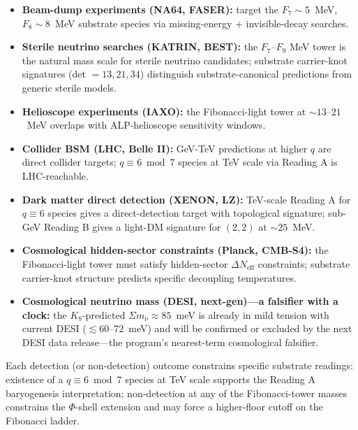\documentclass[11pt]{article}
\begin{document}
\begin{itemize}
\item \textbf{Beam-dump experiments (NA64, FASER):} target the $F_7 \sim 5$~MeV, $F_8 \sim 8$~MeV substrate species via missing-energy + invisible-decay searches.
\item \textbf{Sterile neutrino searches (KATRIN, BEST):} the $F_7$--$F_9$ MeV tower is the natural mass scale for sterile neutrino candidates; substrate carrier-knot signatures (det $= 13, 21, 34$) distinguish substrate-canonical predictions from generic sterile models.
\item \textbf{Helioscope experiments (IAXO):} the Fibonacci-light tower at $\sim 13$--$21$~MeV overlaps with ALP-helioscope sensitivity windows.
\item \textbf{Collider BSM (LHC, Belle II):} GeV-TeV predictions at higher $q$ are direct collider targets; $q \equiv 6 \bmod 7$ species at TeV scale via Reading A is LHC-reachable.
\item \textbf{Dark matter direct detection (XENON, LZ):} TeV-scale Reading A for $q \equiv 6$ species gives a direct-detection target with topological signature; sub-GeV Reading B gives a light-DM signature for $(2, 2)$ at $\sim 25$~MeV.
\item \textbf{Cosmological hidden-sector constraints (Planck, CMB-S4):} the Fibonacci-light tower must satisfy hidden-sector $\Delta N_\text{eff}$ constraints; substrate carrier-knot structure predicts specific decoupling temperatures.
\item \textbf{Cosmological neutrino mass (DESI, next-gen)---a falsifier with a clock:} the $K_8$-predicted $\Sigma m_\nu \approx 85$~meV is already in mild tension with current DESI ($\lesssim 60$--$72$~meV) and will be confirmed or excluded by the next DESI data release---the program's nearest-term cosmological falsifier.
\end{itemize}

Each detection (or non-detection) outcome constrains specific substrate readings: existence of a $q \equiv 6 \bmod 7$ species at TeV scale supports the Reading A baryogenesis interpretation; non-detection at any of the Fibonacci-tower masses constrains the $\Phi$-shell extension and may force a higher-floor cutoff on the Fibonacci ladder.
\end{document}
